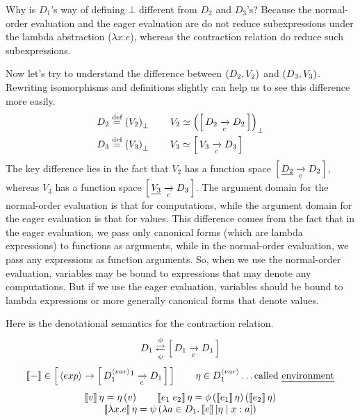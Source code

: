 \begin{enumcirc}
	Why is $D_1$'s way of defining $\bot$ different from $D_2$ and $D_3$'s?
	Because the normal-order evaluation and the eager evaluation are do not reduce
	subexpressions under the lambda abstraction ($\lambda x. e$), whereas the
	contraction relation do reduce such subexpressions.
	\item
	Now let's try to understand the difference between $\left( D_2, V_2 \right)$ and
	$\left( D_3, V_3 \right)$.
	Rewriting isomorphisms and definitions slightly can help us to see this
	difference more easily.
	\begin{align*}
		D_2 & \stackrel{\text{def}}{=} \left( V_2 \right)_\bot \qquad V_2 \simeq \left( \left[ \, D_2 \xrightarrow[c]{} D_2 \, \right] \right)_\bot \\
		D_3 & \stackrel{\text{def}}{=} \left( V_3 \right)_\bot \qquad V_3 \simeq \left[ \, V_3 \xrightarrow[c]{} D_3 \, \right]              \\
	\end{align*}
	The key difference lies in the fact that $V_2$ has a function space
	$\left[ \, \underline{D_2} \xrightarrow[c]{} D_2 \, \right]$,
	whereas $V_3$ has a function space
	$\left[ \, \underline{V_3} \xrightarrow[c]{} D_3 \, \right]$.
	The argument domain for the normal-order evaluation is that for computations,
	while the argument domain for the eager evaluation is that for values.
	This difference comes from the fact that in the eager evaluation, we pass only
	canonical forms (which are lambda expressions) to functions as arguments, while
	in the normal-order evaluation, we pass any expressions as function arguments.
	So, when we use the normal-order evaluation, variables may be bound to
	expressions that may denote any computations.
	But if we use the eager evaluation, variables should be bound to lambda
	expressions or more generally canonical forms that denote values.
	\item
	Here is the denotational semantics for the contraction relation.
	\[
		D_1 \mathrel{\mathop{\rightleftarrows}^{\mathrm{\phi}}_{\mathrm{\psi}}} \left[ \, D_1 \xrightarrow[c]{} D_1 \, \right]
	\]
	\[
		\begin{array}{c}
			\bbrackets{-} \in
			\brackets{ \chevrons{exp} \rightarrow \brackets{ D_1^{\chevrons{var}}\footnotemark \toc D_1 } }
			\qquad \eta \in D_1^{\chevrons{var}} \dots \textrm{called \ul{environment}}                 \\[1em]
			\bbrackets{v}\eta = \eta\prths{v} \qquad
			\bbrackets{e_1 \; e_2}\eta = \phi\prths{\bbrackets{e_1}\eta} \prths{\bbrackets{e_2}\eta}    \\
			\bbrackets{\lambda x. e}\eta = \psi\prths{\lambda a \in D_1 . \bbrackets{e}\aug{\eta}{x:a}} \\

\end{array}\]
\end{enumcirc}

